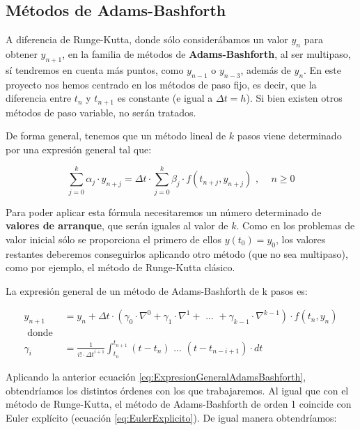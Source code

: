 \subsection{Métodos de Adams-Bashforth}

A diferencia de Runge-Kutta, donde sólo considerábamos un valor $y_n$ para obtener $y_{n+1}$, en la familia de métodos de \textbf{Adams-Bashforth}, al ser multipaso, sí tendremos en cuenta más puntos, como $y_{n-1}$ o $y_{n-3}$, además de $y_n$. En este proyecto nos hemos centrado en los métodos de paso fijo, es decir, que la diferencia entre $t_n$ y $t_{n+1}$ es constante (e igual a $\Delta t = h$). Si bien existen otros métodos de paso variable, no serán tratados.

De forma general, tenemos que un método lineal de $k$ pasos viene determinado por una expresión general tal que: \cite{Molero2007}

\begin{equation}
	\label{eq:MetodoLinealKPasos}
	\sum_{j=0}^{k} \alpha_j \cdot y_{n+j} = \Delta t \cdot \sum_{j=0}^{k} \beta_j \cdot f(t_{n+j} , y_{n+j}) \text{ , }\quad n \geq 0
\end{equation}

Para poder aplicar esta fórmula necesitaremos un número determinado de \textbf{valores de arranque}, que serán iguales al valor de $k$. Como en los problemas de valor inicial sólo se proporciona el primero de ellos $y(t_0)=y_0$, los valores restantes deberemos conseguirlos aplicando otro método (que no sea multipaso), como por ejemplo, el método de Runge-Kutta clásico. 

La expresión general de un método de Adams-Bashforth de k pasos es:\cite{Molero2007}

\begin{equation}
	\label{eq:ExpresionGeneralAdamsBashforth}
	\begin{split}
		y_{n+1} &= y_n + \Delta t \cdot ( \gamma_0 \cdot \nabla^0 + \gamma_1 \cdot \nabla^1 + \text{ ... } + \gamma_{k-1} \cdot \nabla^{k-1} )\cdot f(t_n, y_n) \\
		\text{ donde } \\
		\gamma_i &= \frac{1}{i!\cdot \Delta t^{i+1}} \int_{t_n}^{t_{n+1}} (t-t_n) \text{ ... } (t - t_{n-i+1}) \cdot dt
	\end{split}
\end{equation}

Aplicando la anterior ecuación \ref{eq:ExpresionGeneralAdamsBashforth}, obtendríamos los distintos órdenes con los que trabajaremos. Al igual que con el método de Runge-Kutta, el método de Adams-Bashforth de orden 1 coincide con Euler explícito (ecuación \ref{eq:EulerExplicito}). De igual manera obtendríamos:

